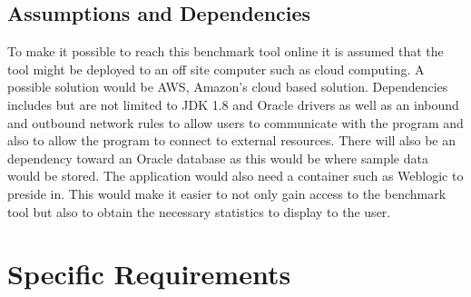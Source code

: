 \documentclass[a4paper,12pt]{article}
\begin{document}
\subsection{Assumptions and Dependencies}
To make it possible to reach this benchmark tool online it is assumed that the tool might be deployed to an off site computer such as cloud computing. A possible solution would be AWS, Amazon's cloud based solution. Dependencies includes but are not limited to JDK 1.8 and Oracle drivers as well as an inbound and outbound network rules to allow users to communicate with the program and also to allow the program to connect to external resources. There will also be an dependency toward an Oracle database as this would be where sample data would be stored. The application would also need a container such as Weblogic to preside in. This would make it easier to not only gain access to the benchmark tool but also to obtain the necessary statistics to display to the user. 

\section{Specific Requirements}
\end{document}
